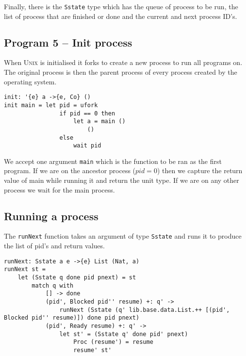\documentclass[logo,bsc,singlespacing,parskip]{infthesis}
\begin{document}
Finally, there is the \texttt{Sstate} type which has the queue of process to be
run, the list of process that are finished or done and the current and next
process ID's.

\begin{tcolorbox}[colback=gray!10, colframe=black, arc=0pt, outer arc=0pt]
  \section*{Program 5 -- Init process}

  When \textsc{Unix} is initialised it forks to create a new process to run all
  programs on. The original process is then the parent process of every process
  created by the operating system.

  \begin{lstlisting}[language=unison]
init: '{e} a ->{e, Co} ()
init main = let pid = ufork
                if pid == 0 then
                    let a = main ()
                        ()
                else
                    wait pid
  \end{lstlisting}

  We accept one argument \texttt{main} which is the function to be ran as the
  first program. If we are on the ancestor process ($pid = 0$) then we capture
  the return value of main while running it and return the unit type. If we are
  on any other process we wait for the main process.
\end{tcolorbox}

\subsection{Running a process}

The \texttt{runNext} function takes an argument of type \texttt{Sstate} and
runs it to produce the list of pid's and return values.

\begin{lstlisting}[language=unison]
runNext: Sstate a e ->{e} List (Nat, a)
runNext st =
    let (Sstate q done pid pnext) = st
        match q with
            [] -> done
            (pid', Blocked pid'' resume) +: q' -> 
                runNext (Sstate (q' lib.base.data.List.++ [(pid', Blocked pid'' resume)]) done pid pnext)
            (pid', Ready resume) +: q' -> 
                let st' = (Sstate q' done pid' pnext)
                    Proc (resume') = resume
                    resume' st'
\end{lstlisting}
\end{document}
